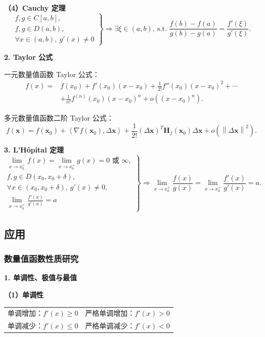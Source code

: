 \documentclass[UTF8,fontset=fandol,zihao=5]{ctexart}
\newcommand{\norm}[1]{\left\lVert#1\right\rVert}
\newcommand{\inner}[2]{\left\langle#1,#2\right\rangle}
\begin{document}
\textbf{（4）Cauchy 定理}
\[
\left.
\begin{array}{l}
f,g\in C[a,b],\\
f,g\in D(a,b),\\
\forall x\in(a,b),\ g'(x)\neq0
\end{array}
\right\}
\Longrightarrow
\exists\xi\in(a,b),\ \text{s.t. }
\frac{f(b)-f(a)}{g(b)-g(a)}=\frac{f'(\xi)}{g'(\xi)}.
\]

\textbf{2. Taylor 公式}

一元数量值函数 Taylor 公式：
\[
\begin{aligned}
f(x)={}&f(x_0)+f'(x_0)(x-x_0)+\frac{1}{2!}f''(x_0)(x-x_0)^2+\cdots\\
&+\frac{1}{n!}f^{(n)}(x_0)(x-x_0)^n+o\!\left((x-x_0)^n\right).
\end{aligned}
\]

多元数量值函数二阶 Taylor 公式：
\[
f(\bm x)=f(\bm x_0)+\inner{\nabla f(\bm x_0)}{\Delta\bm x}
+\frac{1}{2!}(\Delta\bm x)^T\bm H_f(\bm x_0)\Delta\bm x
+o\!\left(\norm{\Delta\bm x}^2\right).
\]

\textbf{3. L'H\^{o}pital 定理}
\[
\left.
\begin{array}{l}
\displaystyle\lim_{x\to x_0^+}f(x)=\lim_{x\to x_0^+}g(x)=0\text{ 或 }\infty,\\
f,g\in D(x_0,x_0+\delta),\\
\forall x\in(x_0,x_0+\delta),\ g'(x)\neq0,\\
\displaystyle\lim_{x\to x_0^+}\frac{f'(x)}{g'(x)}=a
\end{array}
\right\}
\Longrightarrow
\lim_{x\to x_0^+}\frac{f(x)}{g(x)}
=\lim_{x\to x_0^+}\frac{f'(x)}{g'(x)}=a.
\]

\subsection{应用}

\subsubsection{数量值函数性质研究}

\textbf{1. 单调性、极值与最值}

\textbf{（1）单调性}

\begin{center}
\begin{tabularx}{0.88\textwidth}{XX}
\toprule
单调增加：$f'(x)\geq0$ & 严格单调增加：$f'(x)>0$ \\
单调减少：$f'(x)\leq0$ & 严格单调减少：$f'(x)<0$ \\
\bottomrule
\end{tabularx}
\end{center}
\end{document}
